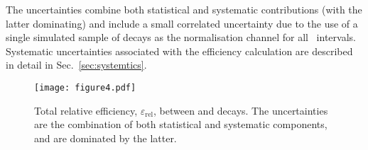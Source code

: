  The uncertainties combine both
 statistical and systematic contributions (with the latter dominating)
 and include a small correlated uncertainty due to the use of a single
 simulated sample of \decay{\Lb}{\jpsi\Lz} decays as the normalisation channel
 for all \qsq\ intervals.  Systematic uncertainties associated with the
 efficiency calculation are described in detail in Sec.~\ref{sec:systemtics}.

\begin{figure}[tbp]
\centering \texttt{[image: figure4.pdf]}
\caption{\small
Total relative efficiency,
$\varepsilon_{\mathrm{rel}}$, between \decay{\Lb}{\Lz\mumu} and
\decay{\Lb}{\jpsi\Lz} decays.
The uncertainties are the combination of
both statistical and systematic components, and are dominated by the
latter.}
\label{fig:relativeTotalEfficiency}
\end{figure}
